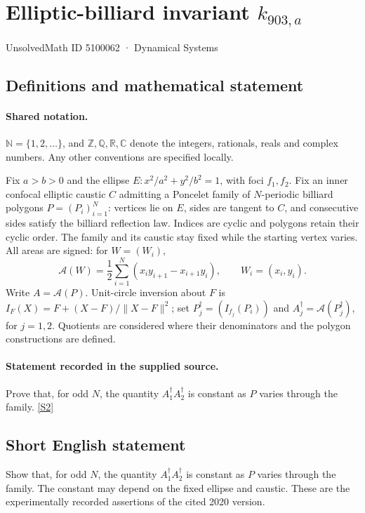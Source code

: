 \documentclass[11pt]{article}
\newcommand{\sref}[2]{\hyperlink{source:#1:#2}{[S#2]}}
\begin{document}
\setcounter{section}{5100061}
\section{Elliptic-billiard invariant $k_{903,a}$}\label{5100062}
{\small\sffamily UnsolvedMath ID 5100062 · Dynamical Systems}
\subsection{Definitions and mathematical statement}

\paragraph{Shared notation.}$\mathbb N=\{1,2,\ldots\}$, and $\mathbb Z,\mathbb Q,\mathbb R,\mathbb C$ denote the integers, rationals, reals and complex numbers. Any other conventions are specified locally.


Fix $a>b>0$ and the ellipse $E:x^2/a^2+y^2/b^2=1$, with foci $f_1,f_2$. Fix an inner confocal elliptic caustic $C$ admitting a Poncelet family of $N$-periodic billiard polygons $P=(P_i)_{i=1}^N$: vertices lie on $E$, sides are tangent to $C$, and consecutive sides satisfy the billiard reflection law. Indices are cyclic and polygons retain their cyclic order. The family and its caustic stay fixed while the starting vertex varies. All areas are signed: for $W=(W_i)$,
\[\mathcal A(W)=\frac12\sum_{i=1}^N(x_i y_{i+1}-x_{i+1}y_i),\qquad W_i=(x_i,y_i).\]
Write $A=\mathcal A(P)$. Unit-circle inversion about $F$ is $I_F(X)=F+(X-F)/\lVert X-F\rVert^2$; set $P_j^\dagger=(I_{f_j}(P_i))$ and $A_j^\dagger=\mathcal A(P_j^\dagger)$, for $j=1,2$. Quotients are considered where their denominators and the polygon constructions are defined.
\paragraph{Statement recorded in the supplied source.}
Prove that, for odd $N$, the quantity $A_1^\dagger A_2^\dagger$ is constant as $P$ varies through the family. \sref{5100062}{2}
\subsection{Short English statement}
Show that, for odd $N$, the quantity $A_1^\dagger A_2^\dagger$ is constant as $P$ varies through the family. The constant may depend on the fixed ellipse and caustic. These are the experimentally recorded assertions of the cited 2020 version.
\end{document}
